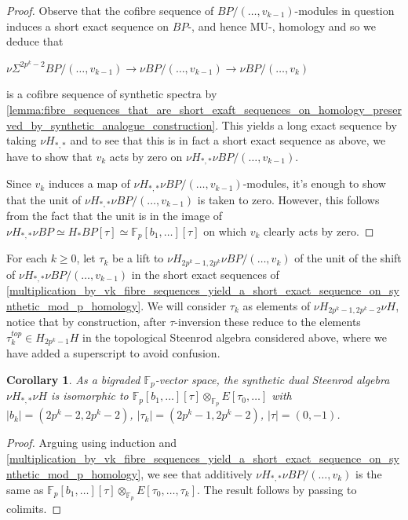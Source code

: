 \documentclass[oneside,a4paper]{amsart}
\newcommand{\MU}{\mathrm{MU}} %
\newcommand{\fieldp}{\mathbb{F}_{p}} %
\theoremstyle{plain}
\newtheorem{cor}[thm]{Corollary}
\theoremstyle{definition}
\theoremstyle{remark}
\begin{document}
\begin{proof}
Observe that the cofibre sequence of $BP / (\ldots, v_{k-1})$-modules in question induces a short exact sequence on $BP$-, and hence $\MU$-, homology and so we deduce that

\begin{center}
$\nu \Sigma ^{2p^{k}-2} BP/(\ldots, v_{k-1}) \rightarrow \nu BP/(\ldots, v_{k-1}) \rightarrow \nu BP/(\ldots, v_{k})$
\end{center}
is a cofibre sequence of synthetic spectra by \cref{lemma:fibre_sequences_that_are_short_exaft_sequences_on_homology_preserved_by_synthetic_analogue_construction}. This yields a long exact sequence by taking $\nu H_{*, *}$ and to see that this is in fact a short exact sequence as above, we have to show that $v_{k}$ acts by zero on $\nu H_{*, *} \nu BP / (\ldots, v_{k-1})$. 

Since $v_{k}$ induces a map of $\nu H_{*, *} \nu BP / (\ldots, v_{k-1})$-modules, it's enough to show that the unit of $\nu H_{*, *} \nu BP / (\ldots, v_{k-1})$ is taken to zero. However, this follows from the fact that the unit is in the image of $\nu H_{*, *} \nu BP \simeq H_{*}BP[\tau] \simeq \fieldp[b_{1}, \ldots][\tau]$ on which $v_{k}$ clearly acts by zero. 
\end{proof}


For each $k \geq 0$, let $\tau_{k}$ be a lift to $\nu H_{2p^{k}-1, 2p^{k}} \nu BP/(\ldots, v_{k})$ of the unit of the shift of $\nu H_{*, *} \nu BP / (\ldots, v_{k-1})$ in the short exact sequences of \cref{multiplication_by_vk_fibre_sequences_yield_a_short_exact_sequence_on_synthetic_mod_p_homology}. We will consider $\tau_{k}$ as elements of $\nu H_{2p^{k}-1, 2p^{k}-2} \nu H$, notice that by construction, after $\tau$-inversion these reduce to the elements $\tau_{k}^{top} \in H_{2p^{k}-1} H$ in the topological Steenrod algebra considered above, where we have added a superscript to avoid confusion. 

\begin{cor}
\label{cor:additive_structure_of_the_synthetic_dual_steenrod_algebra}
As a bigraded $\fieldp$-vector space, the synthetic dual Steenrod algebra $\nu H_{*, *} \nu H$ is isomorphic to $\fieldp[b_{1}, \ldots][\tau] \otimes_{\fieldp} E[\tau_{0}, \ldots]$ with $| b_{k} | = (2p^{k}-2, 2p^{k}-2)$, $| \tau_{k} | = (2p^{k}-1, 2p^{k}-2)$, $| \tau | = (0, -1)$. 
\end{cor}

\begin{proof}
Arguing using induction and \cref{multiplication_by_vk_fibre_sequences_yield_a_short_exact_sequence_on_synthetic_mod_p_homology}, we see that additively $\nu H_{*, *} \nu BP / (\ldots, v_{k})$ is the same as $\fieldp[b_{1}, \ldots][\tau] \otimes_{\fieldp} E[\tau_{0}, \ldots, \tau_{k}]$. The result follows by passing to colimits. 
\end{proof}
\end{document}
